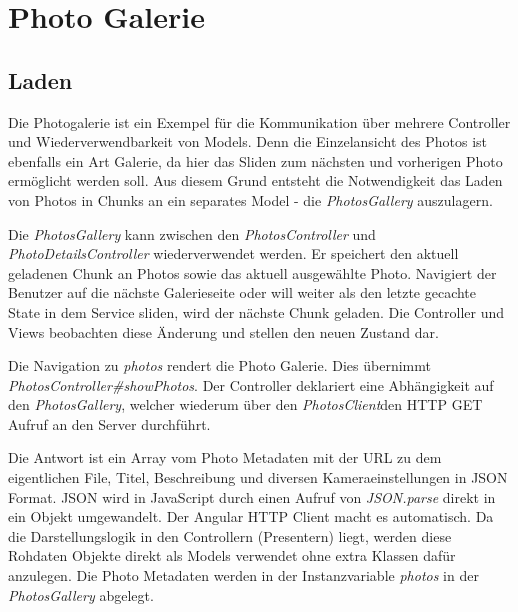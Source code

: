 \section{Photo Galerie}
\label{sec:photo_gallery}

\subsection{Laden}

Die Photogalerie ist ein Exempel für die Kommunikation über mehrere Controller und Wiederverwendbarkeit von Models. Denn die Einzelansicht des Photos ist ebenfalls ein Art Galerie, da hier das Sliden zum nächsten und vorherigen Photo ermöglicht werden soll. Aus diesem Grund entsteht die Notwendigkeit das Laden von Photos in Chunks an ein separates Model - die \textit{PhotosGallery} auszulagern. 

Die \textit{PhotosGallery} kann zwischen den \textit{PhotosController} und \textit{PhotoDetailsController} wiederverwendet werden. Er speichert den aktuell geladenen Chunk an Photos sowie das aktuell ausgewählte Photo. Navigiert der Benutzer auf die nächste Galerieseite oder will weiter als den letzte gecachte State in dem Service sliden, wird der nächste Chunk geladen. Die Controller und Views beobachten diese Änderung und stellen den neuen Zustand dar.

Die Navigation zu \textit{\/photos} rendert die Photo Galerie. Dies übernimmt  \textit{PhotosController\#showPhotos}. Der Controller deklariert eine Abhängigkeit auf den \textit{PhotosGallery}, welcher wiederum über den \textit{PhotosClient}den HTTP GET Aufruf an den Server durchführt. 

Die Antwort ist ein Array vom Photo Metadaten mit der URL zu dem eigentlichen File, Titel, Beschreibung und diversen Kameraeinstellungen in JSON Format. JSON wird in JavaScript durch einen Aufruf von \textit{JSON.parse} direkt in ein Objekt umgewandelt. Der Angular HTTP Client macht es automatisch. Da die Darstellungslogik in den Controllern (Presentern) liegt, werden diese Rohdaten Objekte direkt als Models verwendet ohne extra Klassen dafür anzulegen. Die Photo Metadaten werden in der Instanzvariable \textit{photos} in der \textit{PhotosGallery} abgelegt. 


